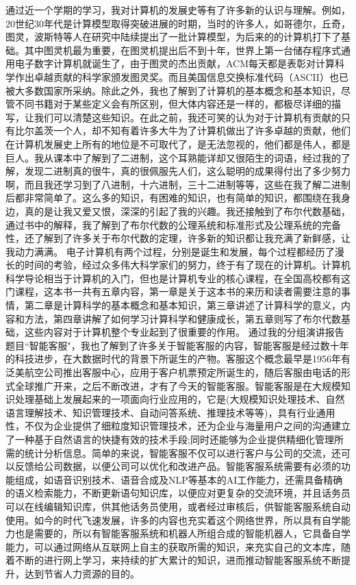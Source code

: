     通过近一个学期的学习，我对计算机的发展史等有了许多新的认识与理解。例如，20世纪30年代是计算模型取得突破进展的时期，当时的许多人，如哥德尔，丘奇，图灵，波斯特等人在研究中陆续提出了一批计算模型，为后来的的计算机打下了基础。其中图灵机最为重要，在图灵机提出后不到十年，世界上第一台储存程序式通用电子数字计算机就诞生了，由于图灵的杰出贡献，ACM每天都是表彰对计算科学作出卓越贡献的科学家颁发图灵奖。而且美国信息交换标准代码（ASCII）也已被大多数国家所采纳。除此之外，我也了解到了计算机的基本概念和基本知识，尽管不同书籍对于某些定义会有所区别，但大体内容还是一样的，都极尽详细的描写，让我们可以清楚这些知识。在此之前，我还可笑的认为对于计算机有贡献的只有比尔盖茨一个人，却不知有着许多大牛为了计算机做出了许多卓越的贡献，他们在计算机发展史上所有的地位是不可取代了，是无法忽视的，他们都是伟人，都是巨人。我从课本中了解到了二进制，这个耳熟能详却又很陌生的词语，经过我的了解，发现二进制真的很牛，真的很佩服先人们，这么聪明的成果得付出了多少努力啊，而且我还学习到了八进制，十六进制，三十二进制等等，这些在我了解二进制后都非常简单了。这么多的知识，有困难的知识，也有简单的知识，都围绕在我身边，真的是让我又爱又恨，深深的引起了我的兴趣。我还接触到了布尔代数基础，通过书中的解释，我了解到了布尔代数的公理系统和标准形式及公理系统的完备性，还了解到了许多关于布尔代数的定理，许多新的知识都让我充满了新鲜感，让我动力满满。   
    电子计算机有两个过程，分别是诞生和发展，每个过程都经历了漫长的时间的考验，经过众多伟大科学家们的努力，终于有了现在的计算机。计算机科学导论相当于计算机的入门，但也是计算机专业的核心课程，在全国高校都有这门课程，这本书一共有五章内容，第一章是关于这本书的来历和读者需要注意的事情，第二章是计算科学的基本概念和基本知识，第三章讲述了计算科学的意义，内容和方法，第四章讲解了如何学习计算科学和健康成长，第五章则写了布尔代数基础，这些内容对于计算机整个专业起到了很重要的作用。
    通过我的分组演讲报告题目“智能客服"，我也了解到了许多关于智能客服的内容，智能客服是经过数十年的科技进步，在大数据时代的背景下所诞生的产物。客服这个概念最早是1956年有泛美航空公司推出客服中心，应用于客户机票预定所诞生的，随后客服由电话的形式全球推广开来，之后不断改进，才有了今天的智能客服。智能客服是在大规模知识处理基础上发展起来的一项面向行业应用的，它是(大规模知识处理技术、自然语言理解技术、知识管理技术、自动问答系统、推理技术等等)，具有行业通用性，不仅为企业提供了细粒度知识管理技术，还为企业与海量用户之间的沟通建立了一种基于自然语言的快捷有效的技术手段;同时还能够为企业提供精细化管理所需的统计分析信息。简单的来说，智能客服不仅可以进行客户与公司的交流，还可以反馈给公司数据，以便公司可以优化和改进产品。智能客服系统需要有必须的功能组成，如语音识别技术、语音合成及NLP等基本的AI工作能力，还需具备精确的语义检索能力，不断更新语句知识库，以便应对更复杂的交流环境，并且话务员可以在线编辑知识库，供其他话务员使用，或者经过审核后，供智能客服系统自动使用。如今的时代飞速发展，许多的内容也充实着这个网络世界，所以具有自学能力也是需要的，所以有智能客服系统和机器人所组合成的智能机器人，它具备自学能力，可以通过网络从互联网上自主的获取所需的知识，来充实自己的文本库，随着不断的进行网上学习，来持续的扩大累计的知识，进而推动智能客服系统不断提升，达到节省人力资源的目的。
